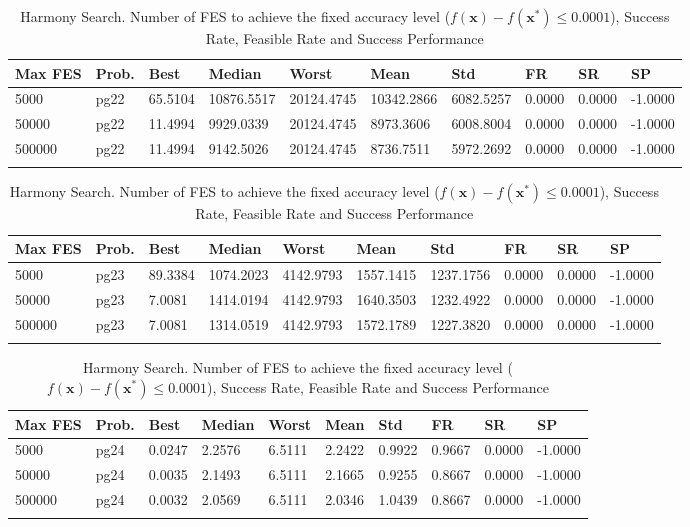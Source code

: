\documentclass[10pt, a4paper]{book}
\begin{document}
\begin{center}
\begin{longtable}{l l l l l l l l l l}
\textbf{Max FES} & \textbf{Prob.} & \textbf{Best} & \textbf{Median} & \textbf{Worst} & \textbf{Mean} & \textbf{Std} & \textbf{FR} & \textbf{SR} & \textbf{SP} \\
\hline
5000 & pg22 & 65.5104 & 10876.5517 & 20124.4745 & 10342.2866 & 6082.5257 & 0.0000 & 0.0000 & -1.0000 \\
50000 & pg22 & 11.4994 & 9929.0339 & 20124.4745 & 8973.3606 & 6008.8004 & 0.0000 & 0.0000 & -1.0000 \\
500000 & pg22 & 11.4994 & 9142.5026 & 20124.4745 & 8736.7511 & 5972.2692 & 0.0000 & 0.0000 & -1.0000 \\

\caption{ Harmony Search. Number of FES to achieve the fixed accuracy level ($f(\mathbf{x}) - f(\mathbf{x}^{*}) \leq 0.0001$), Success Rate, Feasible Rate and Success Performance }
\end{longtable}
\end{center}

\begin{center}
\begin{longtable}{l l l l l l l l l l}
\textbf{Max FES} & \textbf{Prob.} & \textbf{Best} & \textbf{Median} & \textbf{Worst} & \textbf{Mean} & \textbf{Std} & \textbf{FR} & \textbf{SR} & \textbf{SP} \\
\hline
5000 & pg23 & 89.3384 & 1074.2023 & 4142.9793 & 1557.1415 & 1237.1756 & 0.0000 & 0.0000 & -1.0000 \\
50000 & pg23 & 7.0081 & 1414.0194 & 4142.9793 & 1640.3503 & 1232.4922 & 0.0000 & 0.0000 & -1.0000 \\
500000 & pg23 & 7.0081 & 1314.0519 & 4142.9793 & 1572.1789 & 1227.3820 & 0.0000 & 0.0000 & -1.0000 \\

\caption{ Harmony Search. Number of FES to achieve the fixed accuracy level ($f(\mathbf{x}) - f(\mathbf{x}^{*}) \leq 0.0001$), Success Rate, Feasible Rate and Success Performance }
\end{longtable}
\end{center}

\begin{center}
\begin{longtable}{l l l l l l l l l l}
\textbf{Max FES} & \textbf{Prob.} & \textbf{Best} & \textbf{Median} & \textbf{Worst} & \textbf{Mean} & \textbf{Std} & \textbf{FR} & \textbf{SR} & \textbf{SP} \\
\hline
5000 & pg24 & 0.0247 & 2.2576 & 6.5111 & 2.2422 & 0.9922 & 0.9667 & 0.0000 & -1.0000 \\
50000 & pg24 & 0.0035 & 2.1493 & 6.5111 & 2.1665 & 0.9255 & 0.8667 & 0.0000 & -1.0000 \\
500000 & pg24 & 0.0032 & 2.0569 & 6.5111 & 2.0346 & 1.0439 & 0.8667 & 0.0000 & -1.0000 \\

\caption{ Harmony Search. Number of FES to achieve the fixed accuracy level ($f(\mathbf{x}) - f(\mathbf{x}^{*}) \leq 0.0001$), Success Rate, Feasible Rate and Success Performance }
\end{longtable}
\end{center}
\end{document}
